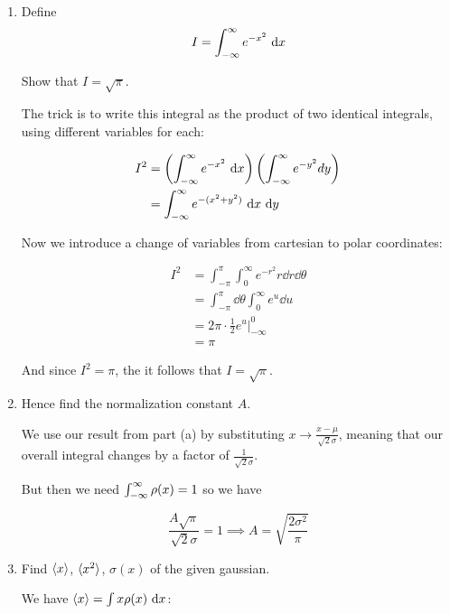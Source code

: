 \documentclass{article}
\begin{document}
\begin{enumerate}[label = (\alph*)]
\item Define 
\[ I = \int_{-\infty}^{\infty} e^{-x^2} \ \mathrm d x\]

Show that $I = \sqrt{\pi}$.

\begin{solution}
    The trick is to write this integral as the product of two identical integrals, using different variables for each:
    
    \begin{align*}
        I^2 &= \left(\int_{-\infty}^{\infty} e^{-x^2} \ \mathrm d x \right)\left(\int_{-\infty}^{\infty} e^{-y^2} dy\right)\\
        &= \int_{-\infty}^{\infty} e^{-(x^2 + y^2)} \ \mathrm d x \ \mathrm d y
    \end{align*}

    Now we introduce a change of variables from cartesian to polar coordinates: 

    \begin{align*}
        I^2 &= \int_{-\pi}^\pi \int_0^\infty e^{-r^2} r \dd r \dd \theta\\
        &= \int_{-\pi}^\pi \dd \theta \int_0^\infty e^{u} \dd u\\
        &= 2\pi \cdot \frac{1}{2} e^u \bigg|_{-\infty}^0\\
        &= \pi
    \end{align*}

    And since $I^2 = \pi$, the it follows that $I = \sqrt{\pi}$.

\end{solution}


\item Hence find the normalization constant $A$.


\begin{solution}
    We use our result from part (a) by substituting $x \to \frac{x - \mu}{\sqrt{2}\sigma}$, meaning that our overall integral changes by a factor of $\frac{1}{\sqrt{2} \sigma}$.

    But then we need $\int_{-\infty}^{\infty} \rho(x) = 1$ so we have 

    \[ \frac{A\sqrt{\pi}}{\sqrt{2} \sigma} = 1 \implies A = \sqrt{\frac{2\sigma^2}{\pi}}\]


\end{solution}

\item Find $\langle x \rangle$, $\langle x^2 \rangle$, $\sigma(x)$ of the given gaussian. %


\begin{solution}
    We have $\langle x \rangle = \int x\rho(x) \ \mathrm d x$:


\end{solution}
\end{enumerate}
\end{document}

